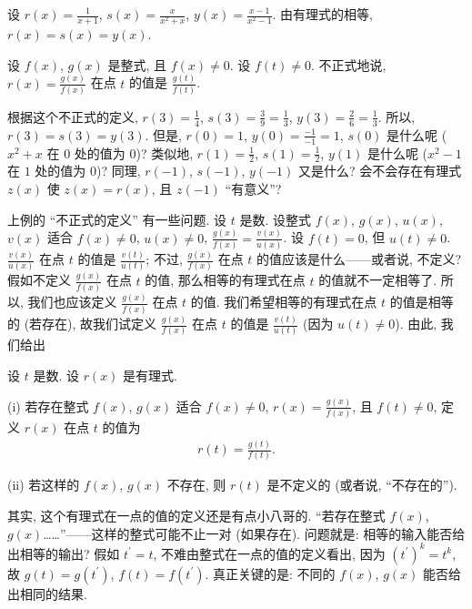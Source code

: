 \begin{example}
    设 $r(x) = \frac{1}{x+1}$, $s(x) = \frac{x}{x^2+x}$, $y(x) = \frac{x-1}{x^2-1}$. 由有理式的相等, $r(x) = s(x) = y(x)$.

    设 $f(x)$, $g(x)$ 是整式, 且 $f(x) \neq 0$. 设 $f(t) \neq 0$. 不正式地说, $r(x) = \frac{g(x)}{f(x)}$ 在点 $t$ 的值是 $\frac{g(t)}{f(t)}$.

    根据这个不正式的定义, $r(3) = \frac{1}{4}$, $s(3) = \frac{3}{9} = \frac{1}{3}$, $y(3) = \frac{2}{6} = \frac{1}{3}$. 所以, $r(3) = s(3) = y(3)$. 但是, $r(0) = 1$, $y(0) = \frac{-1}{-1} = 1$, $s(0)$ 是什么呢 ($x^2+x$ 在 $0$ 处的值为 $0$)? 类似地, $r(1) = \frac{1}{2}$, $s(1) = \frac{1}{2}$, $y(1)$ 是什么呢 ($x^2-1$ 在 $1$ 处的值为 $0$)? 同理, $r(-1)$, $s(-1)$, $y(-1)$ 又是什么? 会不会存在有理式 $z(x)$ 使 $z(x) = r(x)$, 且 $z(-1)$ ``有意义''?
\end{example}

上例的 ``不正式的定义'' 有一些问题. 设 $t$ 是数. 设整式 $f(x)$, $g(x)$, $u(x)$, $v(x)$ 适合 $f(x) \neq 0$, $u(x) \neq 0$, $\frac{g(x)}{f(x)} = \frac{v(x)}{u(x)}$. 设 $f(t) = 0$, 但 $u(t) \neq 0$. $\frac{v(x)}{u(x)}$ 在点 $t$ 的值是 $\frac{v(t)}{u(t)}$; 不过, $\frac{g(x)}{f(x)}$ 在点 $t$ 的值应该是什么——或者说, 不定义? 假如不定义 $\frac{g(x)}{f(x)}$ 在点 $t$ 的值, 那么相等的有理式在点 $t$ 的值就不一定相等了. 所以, 我们也应该定义 $\frac{g(x)}{f(x)}$ 在点 $t$ 的值. 我们希望相等的有理式在点 $t$ 的值是相等的 (若存在), 故我们试定义 $\frac{g(x)}{f(x)}$ 在点 $t$ 的值是 $\frac{v(t)}{u(t)}$ (因为 $u(t) \neq 0$). 由此, 我们给出
\begin{definition}
    设 $t$ 是数. 设 $r(x)$ 是有理式.

    (i) 若存在整式 $f(x)$, $g(x)$ 适合 $f(x) \neq 0$, $r(x) = \frac{g(x)}{f(x)}$, 且 $f(t) \neq 0$, 定义 $r(x)$ 在点 $t$ 的值为
    \begin{align*}
        r(t) = \frac{g(t)}{f(t)}.
    \end{align*}

    (ii) 若这样的 $f(x)$, $g(x)$ 不存在, 则 $r(t)$ 是不定义的 (或者说, ``不存在的'').
\end{definition}

其实, 这个有理式在一点的值的定义还是有点小八哥的. ``若存在整式 $f(x)$, $g(x)$……''——这样的整式可能不止一对 (如果存在). 问题就是: 相等的输入能否给出相等的输出? 假如 $t^{\prime} = t$, 不难由整式在一点的值的定义看出, 因为 $(t^{\prime})^k = t^k$, 故 $g(t) = g(t^{\prime})$, $f(t) = f(t^{\prime})$. 真正关键的是: 不同的 $f(x)$, $g(x)$ 能否给出相同的结果.

